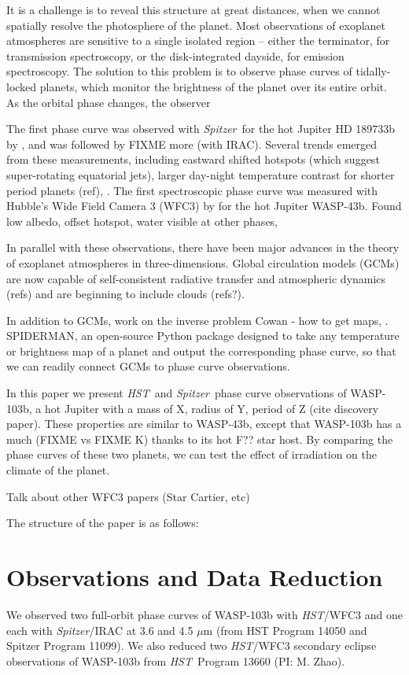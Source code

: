 \documentclass[twocolumn]{aastex61}
\newcommand{\project}[1]{\textsl{#1}}
\newcommand{\HST}{\project{HST}}
\newcommand{\Spitzer}{\project{Spitzer}}
\begin{document}
It is a challenge is to reveal this structure at great distances, when we cannot spatially resolve the photosphere of the planet.  Most observations of exoplanet atmospheres are sensitive to a single isolated region  -- either the terminator, for transmission spectroscopy, or the disk-integrated dayside, for emission spectroscopy.  The solution to this problem is to observe phase curves of tidally-locked planets, which monitor the brightness of the planet over its entire orbit. As the orbital phase changes, the observer 

The first phase curve was observed with \Spitzer\ for the hot Jupiter HD 189733b by \citep{knutson??}, and was followed by FIXME more (with IRAC). Several trends emerged from these measurements, including eastward shifted hotspots (which suggest super-rotating equatorial jets), larger day-night temperature contrast for shorter period planets (ref), . The first spectroscopic phase curve was measured with Hubble's Wide Field Camera 3 (WFC3) by \citep{stevenson???} for the hot Jupiter WASP-43b. Found low albedo, offset hotspot, water visible at other phases, 

In parallel with these observations, there have been major advances in the theory of exoplanet atmospheres in three-dimensions. Global circulation models (GCMs) are now capable of self-consistent radiative transfer and atmospheric dynamics (refs) and are beginning to include clouds (refs?). 

In addition to GCMs, work on the inverse problem Cowan - how to get maps, . SPIDERMAN, an open-source Python package designed to take any temperature or brightness map of a planet and output the corresponding phase curve, so that we can readily connect GCMs to phase curve observations.  




In this paper we present \HST\ and \Spitzer\ phase curve observations of WASP-103b, a hot Jupiter with a mass of X, radius of Y, period of Z (cite discovery paper). These properties are similar to WASP-43b, except that WASP-103b has a much (FIXME vs FIXME K) thanks to its hot F?? star host. By comparing the phase curves of these two planets, we can test the effect of irradiation on the climate of the planet.

Talk about other WFC3 papers (Star Cartier, etc)

The structure of the paper is as follows:

\section{Observations and Data Reduction}
We observed two full-orbit phase curves of WASP-103b with \HST/WFC3 and one each with \Spitzer/IRAC at 3.6 and 4.5 $\mu$m (from HST Program 14050 and Spitzer Program 11099). We also reduced two \HST/WFC3 secondary eclipse observations of WASP-103b from \HST\ Program 13660 (PI: M. Zhao).
\end{document}
